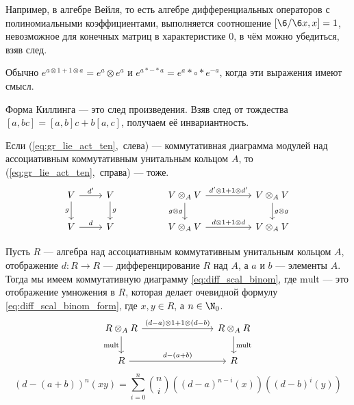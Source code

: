 \documentclass[
	extrafontsizes,
	11pt,
	hyphens,
]{memoir}
\begin{document}
\begin{remark}
Например, в алгебре Вейля, то есть алгебре дифференциальных операторов с полиномиальными коэффициентами, выполняется соотношение \([\6 / \6 x, x] = 1\), невозможное для конечных матриц в характеристике \(0\), в чём можно убедиться, взяв след.
\end{remark}

\begin{observation}
Обычно \(e^{a \otimes 1 + 1 \otimes a} = e^a \otimes e^a\) и \(e^{a* - *a} = e^a* \circ *e^{-a}\), когда эти выражения имеют смысл.
\end{observation}

\begin{observation}%
Форма Киллинга --- это след произведения. Взяв след от тождества
\([a,bc]=[a,b]c+b[a,c]\), получаем её инвариантность.
\end{observation}

\begin{observation}
Если (\ref{eq:gr_lie_act_ten},~слева) --- коммутативная диаграмма модулей над ассоциативным коммутативным унитальным кольцом \(A\), то (\ref{eq:gr_lie_act_ten},~справа) --- тоже.
\begin{equation}
\label{eq:gr_lie_act_ten}
\begin{tikzcd}
V \ar{r}{d'} \ar[swap]{d}{g} &
V \ar{d}{g} &
&
V \otimes_A V \ar{rr}{d' \otimes 1 + 1 \otimes d'} \ar[swap]{d}{g \otimes g} &
&
V \otimes_A V \ar{d}{g \otimes g}
\\
V \ar{r}{d} &
V &
&
V \otimes_A V \ar{rr}{d \otimes 1 + 1 \otimes d} &
&
V \otimes_A V
\end{tikzcd}
\end{equation}
\end{observation}

\begin{observation}
Пусть \(R\) --- алгебра над ассоциативным коммутативным унитальным кольцом \(A\), отображение \(d : R \to R\) --- дифференцирование \(R\) над \(A\), а \(a\) и \(b\) --- элементы \(A\).
Тогда мы имеем коммутативную диаграмму \eqref{eq:diff_scal_binom}, где \(\mathrm{mult}\) --- это отображение умножения в \(R\), которая делает очевидной формулу \eqref{eq:diff_scal_binom_form}, где \(x,y \in R\), а \(n \in \N_0\).
\begin{equation}
\label{eq:diff_scal_binom}
\begin{tikzcd}[column sep = 7.5em]
R \otimes_A R \ar[swap]{d}{\mathrm{mult}} \ar{r}{(d-a) \otimes 1 + 1 \otimes (d-b)} &
R \otimes_A R \ar{d}{\mathrm{mult}}
\\
R \ar{r}{d - (a + b)} &
R
\end{tikzcd}
\end{equation}
\begin{equation}
\label{eq:diff_scal_binom_form}
(d - (a + b))^n (xy) =
\sum_{i=0}^n \binom{n}{i} ((d - a)^{n-i} (x)) ((d - b)^i (y))
\end{equation}
\end{observation}
\end{document}
